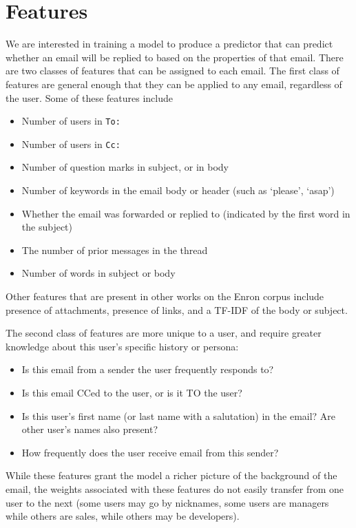 \documentclass[10pt]{article}
\begin{document}
\section*{Features}

We are interested in training a model to produce a predictor that can predict whether an email will be replied to based on the properties of that email. There are two classes of features that can be assigned to each email. The first class of features are general enough that they can be applied to any email, regardless of the user. Some of these features include

\begin{itemize}[noitemsep]
\item Number of users in \texttt{To:}
\item Number of users in \texttt{Cc:}
\item Number of question marks in subject, or in body
\item Number of keywords in the email body or header (such as `please', `asap')
\item Whether the email was forwarded or replied to (indicated by the first word in the subject)
\item The number of prior messages in the thread
\item Number of words in subject or body
\end{itemize}

Other features that are present in other works on the Enron corpus include presence of attachments, presence of links, and a TF-IDF of the body or subject. \cite{cruzalbrecht:2017,knight:2014,bromberg:2013}

The second class of features are more unique to a user, and require greater knowledge about this user's specific history or persona:

\begin{itemize}[noitemsep]
\item Is this email from a sender the user frequently responds to?
\item Is this email CCed to the user, or is it TO the user?
\item Is this user's first name (or last name with a salutation) in the email? Are other user's names also present?
\item How frequently does the user receive email from this sender?
\end{itemize}

While these features grant the model a richer picture of the background of the email, the weights associated with these features do not easily transfer from one user to the next (some users may go by nicknames, some users are managers while others are sales, while others may be developers). 
\end{document}
